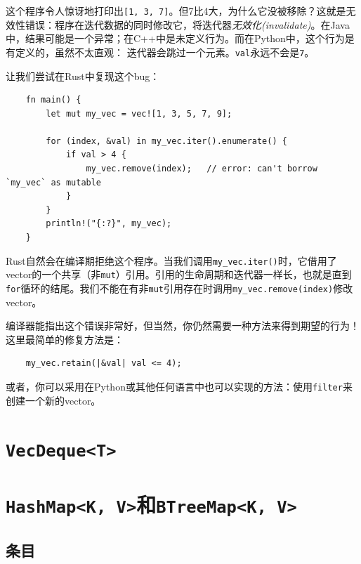 这个程序令人惊讶地打印出\texttt{[1, 3, 7]}。但7比4大，为什么它没被移除？这就是无效性错误：程序在迭代数据的同时修改它，将迭代器\emph{无效化(invalidate)}。在Java中，结果可能是一个异常；在C++中是未定义行为。而在Python中，这个行为是有定义的，虽然不太直观：
迭代器会跳过一个元素。\texttt{val}永远不会是\texttt{7}。

让我们尝试在Rust中复现这个bug：
\begin{verbatim}
    fn main() {
        let mut my_vec = vec![1, 3, 5, 7, 9];
        
        for (index, &val) in my_vec.iter().enumerate() {
            if val > 4 {
                my_vec.remove(index);   // error: can't borrow `my_vec` as mutable
            }
        }
        println!("{:?}", my_vec);
    }
\end{verbatim}

Rust自然会在编译期拒绝这个程序。当我们调用\texttt{my\_vec.iter()}时，它借用了vector的一个共享（非\texttt{mut}）引用。引用的生命周期和迭代器一样长，也就是直到\texttt{for}循环的结尾。我们不能在有非\texttt{mut}引用存在时调用\texttt{my\_vec.remove(index)}修改vector。

编译器能指出这个错误非常好，但当然，你仍然需要一种方法来得到期望的行为！这里最简单的修复方法是：
\begin{verbatim}
    my_vec.retain(|&val| val <= 4);
\end{verbatim}

或者，你可以采用在Python或其他任何语言中也可以实现的方法：使用\texttt{filter}来创建一个新的vector。

\section{\texttt{VecDeque<T>}}

\section{\texttt{HashMap<K, V>}和\texttt{BTreeMap<K, V>}}

\subsection{条目}\label{entry}